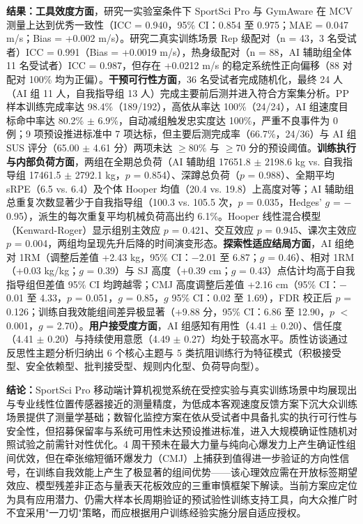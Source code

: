 \textbf{结果：}\textbf{工具效度方面}，研究一实验室条件下 SportSci Pro 与 GymAware 在 MCV 测量上达到优秀一致性（ICC = 0.940，95\% CI：0.854 至 0.975；MAE = 0.047 m/s；Bias = +0.002 m/s）。研究二真实训练场景 Rep 级配对（n = 43，3 名受试者）ICC = 0.991（Bias = +0.0019 m/s），热身级配对（n = 88，AI 辅助组全体 11 名受试者）ICC = 0.987，但存在 +0.0212 m/s 的稳定系统性正向偏移（88 对配对 100\% 均为正偏）。\textbf{干预可行性方面}，36 名受试者完成随机化，最终 24 人（AI 组 11 人，自我指导组 13 人）完成主要前后测并进入符合方案集分析。PP 样本训练完成率达 98.4\%（189/192），高依从率达 100\%（24/24），AI 组速度目标命中率达 80.2\% $\pm$ 6.9\%，自动减组触发忠实度达 100\%，严重不良事件为 0 例；9 项预设推进标准中 7 项达标，但主要后测完成率（66.7\%，24/36）与 AI 组 SUS 评分（65.00 $\pm$ 4.61 分）两项未达 $\geq$80\% 与 $\geq$70 分的预设阈值。\textbf{训练执行与内部负荷方面}，两组在全期总负荷（AI 辅助组 17651.8 $\pm$ 2198.6 kg vs. 自我指导组 17461.5 $\pm$ 2792.1 kg，$p$ = 0.854）、深蹲总负荷（$p$ = 0.988）、全期平均 sRPE（6.5 vs. 6.4）及个体 Hooper 均值（20.4 vs. 19.8）上高度对等；AI 辅助组总重复次数显著少于自我指导组（100.3 vs. 105.5 次，$p$ = 0.035，Hedges' $g$ = $-$0.95），派生的每次重复平均机械负荷高出约 6.1\%。Hooper 线性混合模型（Kenward-Roger）显示组别主效应 $p$ = 0.421、交互效应 $p$ = 0.945、课次主效应 $p$ = 0.004，两组均呈现先升后降的时间演变形态。\textbf{探索性适应结局方面}，AI 组绝对 1RM（调整后差值 +2.43 kg，95\% CI：$-$2.01 至 6.87；$g$ = 0.46）、相对 1RM（+0.03 kg/kg；$g$ = 0.39）与 SJ 高度（+0.39 cm；$g$ = 0.43）点估计均高于自我指导组但差值 95\% CI 均跨越零；CMJ 高度调整后差值 +2.16 cm（95\% CI：$-$0.01 至 4.33，$p$ = 0.051，$g$ = 0.85，$g$ 95\% CI：0.02 至 1.69），FDR 校正后 $p$ = 0.126；训练自我效能组间差异极显著（+9.88 分，95\% CI：6.86 至 12.90，$p$ $<$ 0.001，$g$ = 2.70）。\textbf{用户接受度方面}，AI 组感知有用性（4.41 $\pm$ 0.20）、信任度（4.41 $\pm$ 0.20）与持续使用意愿（4.49 $\pm$ 0.27）均处于较高水平。质性访谈通过反思性主题分析归纳出 6 个核心主题与 5 类抗阻训练行为特征模式（积极接受型、安全依赖型、批判接受型、规则内化型、负荷导向型）。

\textbf{结论：}SportSci Pro 移动端计算机视觉系统在受控实验与真实训练场景中均展现出与专业线性位置传感器接近的测量精度，为低成本客观速度反馈方案下沉大众训练场景提供了测量学基础；数智化监控方案在依从受试者中具备扎实的执行可行性与安全性，但招募保留率与系统可用性未达预设推进标准，进入大规模确证性随机对照试验之前需针对性优化。4 周干预未在最大力量与纯向心爆发力上产生确证性组间优效，但在牵张缩短循环爆发力（CMJ）上捕获到值得进一步验证的方向性信号，在训练自我效能上产生了极显著的组间优势——该心理效应需在开放标签期望效应、模型残差非正态与量表天花板效应的三重审慎框架下解读。当前方案应定位为具有应用潜力、仍需大样本长周期验证的预试验性训练支持工具，向大众推广时不宜采用"一刀切"策略，而应根据用户训练经验实施分层自适应授权。


